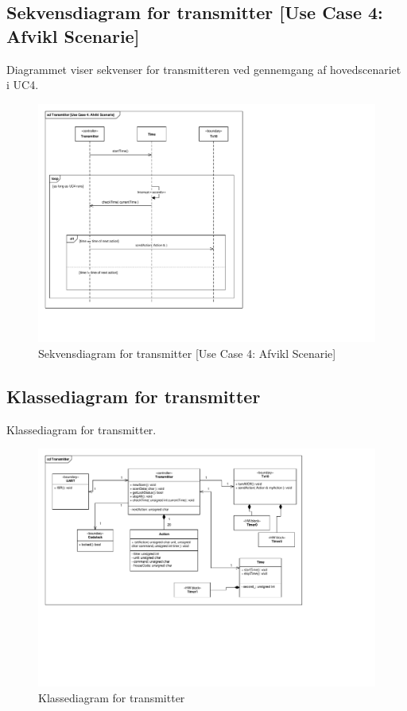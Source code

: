 \clearpage

\subsection{Sekvensdiagram for transmitter [Use Case 4: Afvikl Scenarie]}
Diagrammet viser sekvenser for transmitteren ved gennemgang af hovedscenariet i UC4.
\begin{figure}[h]
	\centering 
	\includegraphics[width={\textwidth},trim=17 75 330 17, clip=true]{Systemarkitektur/Diagrammer/Transmitter_UC4_Sekvens.pdf}
	\caption{Sekvensdiagram for transmitter [Use Case 4: Afvikl Scenarie]}
	\label{fig:Trans_UC4Sek}
\end{figure}

\clearpage

\begin{landscape}
\subsection{Klassediagram for transmitter}
Klassediagram for transmitter.
\begin{figure}[h]
	\centering 
	\includegraphics[height={\textwidth - 3.5 cm},trim=17 195 180 18, clip=true]{Systemarkitektur/Diagrammer/Transmitter_Klassediagram.pdf}
	\caption{Klassediagram for transmitter}
	\label{fig:Trans_Klasse}
\end{figure}
\end{landscape}

